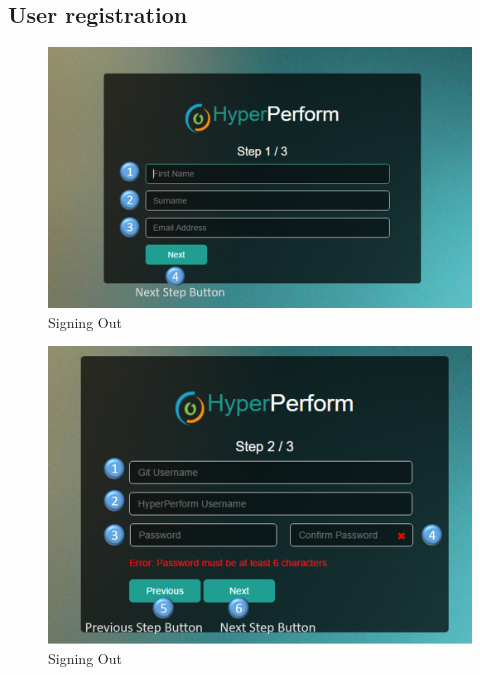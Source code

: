 \documentclass[11pt,a4paper]{article}
\begin{document}
\subsection{User registration}
\begin{figure}[H]
	\begin{center}
		\includegraphics[width=\linewidth]{../Images/Getting_Started/Step_1_numbered}
		\caption{Signing Out}
	\end{center}
\end{figure}

\begin{figure}[H]
	\begin{center}
		\includegraphics[width=\linewidth]{../Images/Getting_Started/Step_2_numbered}
		\caption{Signing Out}
	\end{center}
\end{figure}
\end{document}

